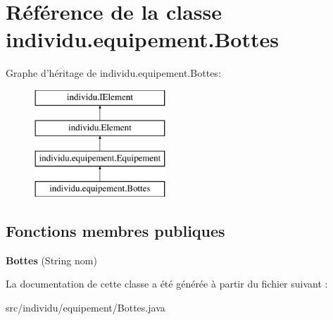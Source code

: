 \hypertarget{classindividu_1_1equipement_1_1_bottes}{\section{Référence de la classe individu.\-equipement.\-Bottes}
\label{classindividu_1_1equipement_1_1_bottes}
}
Graphe d'héritage de individu.\-equipement.\-Bottes\-:\begin{figure}[H]
\begin{center}
\leavevmode
\includegraphics[height=4.000000cm]{classindividu_1_1equipement_1_1_bottes}
\end{center}
\end{figure}
\subsection*{Fonctions membres publiques}
\begin{DoxyCompactItemize}
\item 
\hypertarget{classindividu_1_1equipement_1_1_bottes_aa3558953e68ab09d53d2e99d620bd295}{{\bfseries Bottes} (String nom)}\label{classindividu_1_1equipement_1_1_bottes_aa3558953e68ab09d53d2e99d620bd295}

\end{DoxyCompactItemize}


La documentation de cette classe a été générée à partir du fichier suivant \-:\begin{DoxyCompactItemize}
\item 
src/individu/equipement/Bottes.\-java\end{DoxyCompactItemize}
